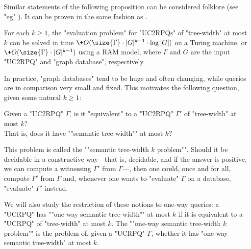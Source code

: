 Similar statements of the following proposition can be considered
folklore (see "eg" {\cite[Theorem IV.3]{RomeroBarceloVardi2017Homomorphism}}).
It can be proven in the same fashion as .
\begin{proposition}
	\AP\label{prop:crpq-bound-tree-width-upper-bound}
    For each $k \geq 1$, the "evaluation problem" for "UC2RPQs" of "tree-width" at
    most $k$ can be solved in time $\+O(\size{\Gamma} \cdot |G|^{k+1} \cdot \log{|G|})$ on a Turing machine,
	or $\+O(\size{\Gamma} \cdot |G|^{k+1})$ using a RAM model, where $\Gamma$ and $G$ are the input "UC2RPQ" and "graph database", respectively.
\end{proposition}


In practice, "graph databases" tend to be huge and often changing, while queries
are in comparison very small and fixed.
This motivates the following question, given some natural $k \geq 1$: 

\begin{center}
    \AP 
    Given a "UC2RPQ" $\Gamma$, is it "equivalent" to a "UC2RPQ" $\Gamma'$ of "tree-width" at most $k$?\\
    That is, does it have ""semantic tree-width"" at most $k$?
\end{center}
This problem is called the ""semantic tree-width $k$ problem"".
Should it be decidable in a constructive way---that is, decidable, and if the answer is positive, we can compute a witnessing $\Gamma'$ from $\Gamma$---, then one could, once and for all,
compute $\Gamma'$ from $\Gamma$ and, whenever one wants to "evaluate" $\Gamma$ on a
database, "evaluate" $\Gamma'$ instead.

We will also study the restriction of these notions to one-way queries: a "UCRPQ" has \AP""one-way semantic tree-width"" at most $k$ if it is equivalent to a "UCRPQ" of "tree-width" at most $k$. The \AP""one-way semantic tree-width $k$ problem"" is the problem of, given a "UCRPQ" $\Gamma$, whether it has "one-way semantic tree-width" at most $k$.


